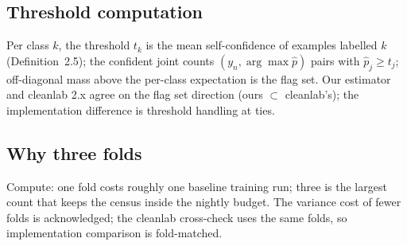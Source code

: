 \subsection{Threshold computation}
Per class $k$, the threshold $t_k$ is the mean self-confidence of
examples labelled $k$ (Definition~2.5); the confident joint counts
$(y_n, \arg\max \hat p)$ pairs with $\hat p_j \ge t_j$; off-diagonal mass
above the per-class expectation is the flag set. Our estimator and
cleanlab 2.x agree on the flag set direction (ours $\subset$ cleanlab's);
the implementation difference is threshold handling at ties.
\subsection{Why three folds}
Compute: one fold costs roughly one baseline training run; three is the
largest count that keeps the census inside the nightly budget. The
variance cost of fewer folds is acknowledged; the cleanlab cross-check
uses the same folds, so implementation comparison is fold-matched.
